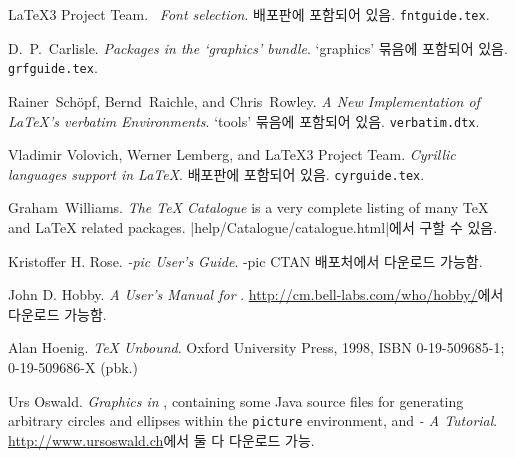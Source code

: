\begin{thebibliography}{99}
 \LaTeX3 Project Team.  \newblock \emph{\LaTeXe~Font
    selection}. 
  \newblock \LaTeXe{} 배포판에 포함되어 있음. \texttt{fntguide.tex}.

 D.~P.~Carlisle.  \newblock \emph{Packages in the
    `graphics' bundle}. 
  \newblock `graphics' 묶음에 포함되어 있음. \texttt{grfguide.tex}.

 Rainer~Sch\"opf, Bernd~Raichle, and Chris~Rowley.
\newblock \emph{A New Implementation of \LaTeX's verbatim
  Environments}.
  \newblock `tools' 묶음에 포함되어 있음. \texttt{verbatim.dtx}.

 Vladimir Volovich, Werner Lemberg, and \LaTeX3 Project Team.
    \newblock \emph{Cyrillic languages support in \LaTeX}.
  \newblock \LaTeXe{} 배포판에  포함되어 있음. \texttt{cyrguide.tex}.

 Graham~Williams.  \newblock \emph{The TeX
    Catalogue} is a very complete listing of many \TeX{} and \LaTeX{}
    related packages.
  \newblock \CTAN|help/Catalogue/catalogue.html|에서 구할 수 있음.

 Kristoffer H. Rose.
  \newblock \emph{\Xy-pic User's Guide}.  
    \Xy-pic CTAN 배포처에서 다운로드 가능함.

 John D. Hobby.
  \newblock \emph{A User's Manual for \MP}.
  \newblock \url{http://cm.bell-labs.com/who/hobby/}에서 다운로드 가능함.

 Alan Hoenig.
  \newblock \emph{\TeX{} Unbound}. \newblock Oxford University Press, 1998,
    ISBN 0-19-509685-1; 0-19-509686-X (pbk.)

 Urs Oswald.
    \newblock \emph{Graphics in \LaTeXe{}}, containing some Java source files for
    generating arbitrary circles and ellipses within the \texttt{picture} environment,
    and \emph{\MP{} - A Tutorial}.
  \newblock \url{http://www.ursoswald.ch}에서 둘 다 다운로드 가능.


\end{thebibliography}
